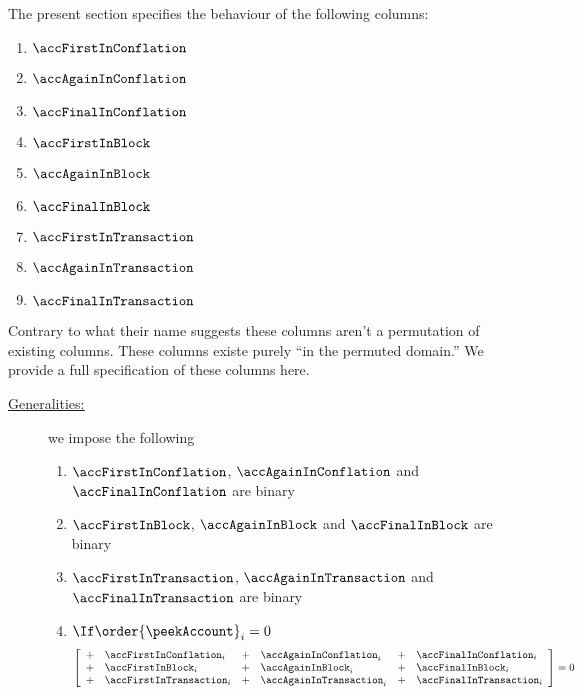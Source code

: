 The present section specifies the behaviour of the following columns:
\begin{multicols}{3}
	\begin{enumerate}
		\item $\accFirstInConflation$
		\item $\accAgainInConflation$
		\item $\accFinalInConflation$
		\item $\accFirstInBlock$
		\item $\accAgainInBlock$
		\item $\accFinalInBlock$
		\item $\accFirstInTransaction$
		\item $\accAgainInTransaction$
		\item $\accFinalInTransaction$
	\end{enumerate}
\end{multicols}
\noindent Contrary to what their name suggests these columns aren't a permutation of existing columns.
These columns existe purely ``in the permuted domain.''
We provide a full specification of these columns here.
\begin{description}
	\item[\underline{\underline{Generalities:}}]
		we impose the following
		\begin{enumerate}
			\item $\accFirstInConflation$,  $\accAgainInConflation$  and $\accFinalInConflation$  are binary
			\item $\accFirstInBlock$,       $\accAgainInBlock$       and $\accFinalInBlock$       are binary
			\item $\accFirstInTransaction$, $\accAgainInTransaction$ and $\accFinalInTransaction$ are binary
			\item $\If \order{\peekAccount} _{i} = 0$ \Then
				\[
					\left[ \begin{array}{clclcl}
						+ & \accFirstInConflation   _{i} & + & \accAgainInConflation   _{i} & + & \accFinalInConflation   _{i} \\
						+ & \accFirstInBlock        _{i} & + & \accAgainInBlock        _{i} & + & \accFinalInBlock        _{i} \\
						+ & \accFirstInTransaction  _{i} & + & \accAgainInTransaction  _{i} & + & \accFinalInTransaction  _{i} \\
					\end{array} \right]
					=
					0
				\]
		\end{enumerate}
\end{description}
